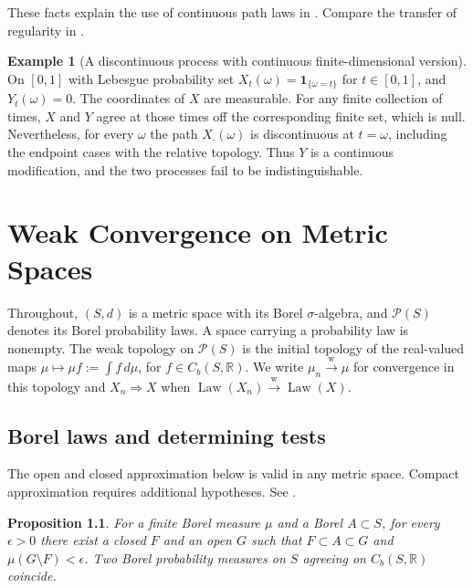 \documentclass[11pt,oneside,openany]{book}
\newcommand{\R}{\mathbb{R}}
\DeclareMathOperator{\Law}{Law}
\newcommand{\ind}{\mathbf{1}}
\newcommand{\weakto}{\xrightarrow{\mathrm{w}}}
\theoremstyle{plain}
\newtheorem{proposition}[theorem]{Proposition}
\theoremstyle{definition}
\newtheorem{example}[theorem]{Example}
\theoremstyle{remark}
\begin{document}
These facts explain the use of continuous path laws in \cite[Sections 7--8, pp.~80--90]{Billingsley}. Compare the transfer of regularity in \cite[Lemma 4.24, p.~96]{Kallenberg}.

\begin{example}[A discontinuous process with continuous finite-dimensional version]
On \([0,1]\) with Lebesgue probability set \(X_t(\omega)=\ind_{\{\omega=t\}}\) for \(t\in[0,1]\), and \(Y_t(\omega)=0\). The coordinates of \(X\) are measurable. For any finite collection of times, \(X\) and \(Y\) agree at those times off the corresponding finite set, which is null. Nevertheless, for every \(\omega\) the path \(X_\cdot(\omega)\) is discontinuous at \(t=\omega\), including the endpoint cases with the relative topology. Thus \(Y\) is a continuous modification, and the two processes fail to be indistinguishable.
\end{example}
\chapter{Weak Convergence on Metric Spaces}
\label{ch:weak-convergence}

Throughout, \((S,d)\) is a metric space with its Borel \(\sigma\)-algebra, and
\(\mathcal P(S)\) denotes its Borel probability laws. A space carrying a
probability law is nonempty. The weak topology on \(\mathcal P(S)\) is the
initial topology of the real-valued maps
\(\mu\mapsto\mu f:=\int f\,d\mu\), for \(f\in C_b(S,\R)\). We write
\(\mu_n\weakto\mu\) for convergence in this topology and
\(X_n\Rightarrow X\) when \(\Law(X_n)\weakto\Law(X)\).

\section{Borel laws and determining tests}
\label{p06-01}

The open and closed approximation below is valid in any metric space.
Compact approximation requires additional hypotheses. See
\cite[Theorems 1.1--1.3, pp.~7--9]{Billingsley}.

\begin{proposition}
\label{prop:p06-regularity}
For a finite Borel measure \(\mu\) and a Borel \(A\subset S\), for every
\(\epsilon>0\) there exist a closed \(F\) and an open \(G\) such that
\(F\subset A\subset G\) and \(\mu(G\setminus F)<\epsilon\).
Two Borel probability measures on \(S\) agreeing on \(C_b(S,\R)\) coincide.
\end{proposition}
\end{document}
